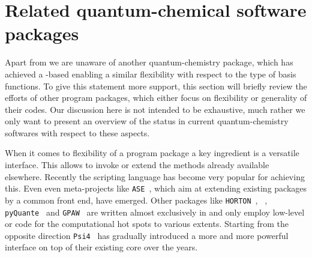 \section{Related quantum-chemical software packages}
\label{sec:MolsturmRelated}
\newcommand{\psifour}{\texttt{Psi4}\xspace}
\newcommand{\pyquante}{\texttt{pyQuante}\xspace}
\newcommand{\horton}{\texttt{HORTON}\xspace}
\newcommand{\gpaw}{\texttt{GPAW}\xspace}
\newcommand{\ASE}{\texttt{ASE}\xspace}
\newcommand{\CPtK}{\texttt{CP2K}\xspace}

Apart from \molsturm we are unaware of another quantum-chemistry package,
which has achieved a \contraction-based \SCF enabling
a similar flexibility with respect to the type of basis functions.
To give this statement more support,
this section will briefly review the efforts
of other program packages,
which either focus on flexibility or generality of their codes.
Our discussion here is not intended to be exhaustive,
much rather we only want to present an overview of the status
in current quantum-chemistry softwares with respect to these aspects.

When it comes to flexibility of a program package
a key ingredient is a versatile interface.
This allows to invoke or extend the methods already available elsewhere.
Recently the scripting language \python has become very popular
for achieving this.
Even even meta-projects like \ASE~\cite{Larsen2017},
which aim at extending existing packages by a common \python front end,
have emerged.
Other packages like \horton~\cite{Verstraelen2017}, \pyscf~\cite{Sun2017},
\pyquante~\cite{PyQuante} and \gpaw~\cite{Mortensen2005,Enkovaara2010} are written
almost exclusively in \python and only employ low-level \ccc or \cpp
code for the computational hot spots to various extents.
Starting from the opposite direction \psifour~\cite{Parrish2017} has
gradually introduced a more and more powerful \python interface on top of
their existing \cpp core over the years.


